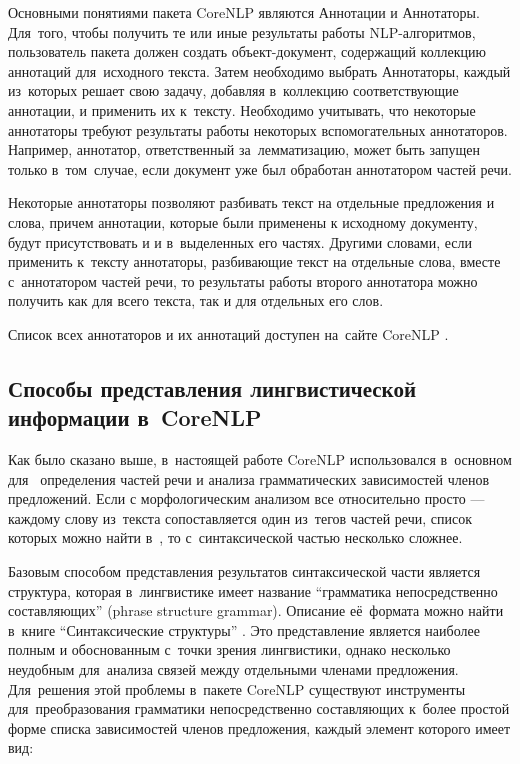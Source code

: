 Основными понятиями пакета CoreNLP являются Аннотации и Аннотаторы. 
Для~того, чтобы получить те или иные результаты работы NLP-алгоритмов,
пользователь пакета должен создать объект-документ,
содержащий коллекцию аннотаций для~исходного текста. 
Затем необходимо выбрать Аннотаторы, каждый из~которых решает свою задачу, 
добавляя в~коллекцию соответствующие аннотации, и применить их к~тексту. 
Необходимо учитывать, что некоторые аннотаторы требуют результаты работы некоторых вспомогательных аннотаторов.
Например, аннотатор, ответственный за~лемматизацию, может быть запущен
только в~том~случае, если документ уже был обработан аннотатором частей речи.

Некоторые аннотаторы позволяют разбивать текст на отдельные предложения и слова,
причем аннотации, которые были применены к исходному документу, будут присутствовать и
и в~выделенных его частях. 
Другими словами, если применить к~тексту аннотаторы, разбивающие текст на отдельные слова,
вместе с~аннотатором частей речи, то результаты работы второго аннотатора 
можно получить как для всего текста, так и для отдельных его слов.

Список всех аннотаторов и их аннотаций доступен на~сайте CoreNLP \cite{corenlp}.

\subsection{Способы представления лингвистической информации в~CoreNLP}
\label{sec:corenlp_representation_methods}
Как было сказано выше, в~настоящей работе CoreNLP использовался в~основном для~
определения частей речи и анализа грамматических зависимостей членов предложений.
Если с морфологическим анализом все относительно просто ---
 каждому слову из~текста сопоставляется один из~тегов частей речи, список которых можно найти в~\cite{treebank},
то с~синтаксической частью несколько сложнее.

Базовым способом представления результатов синтаксической части является структура,
которая в~лингвистике имеет название ``грамматика непосредственно составляющих'' (phrase structure grammar). 
Описание её~формата можно найти в~книге ``Синтаксические структуры'' \cite{homsky}.
Это представление является наиболее полным и обоснованным с~точки зрения лингвистики, 
однако несколько неудобным для~анализа связей между отдельными членами предложения.
Для~решения этой проблемы в~пакете CoreNLP существуют инструменты 
для~преобразования грамматики непосредственно составляющих к~более простой форме списка зависимостей членов предложения, 
каждый элемент которого имеет вид:

